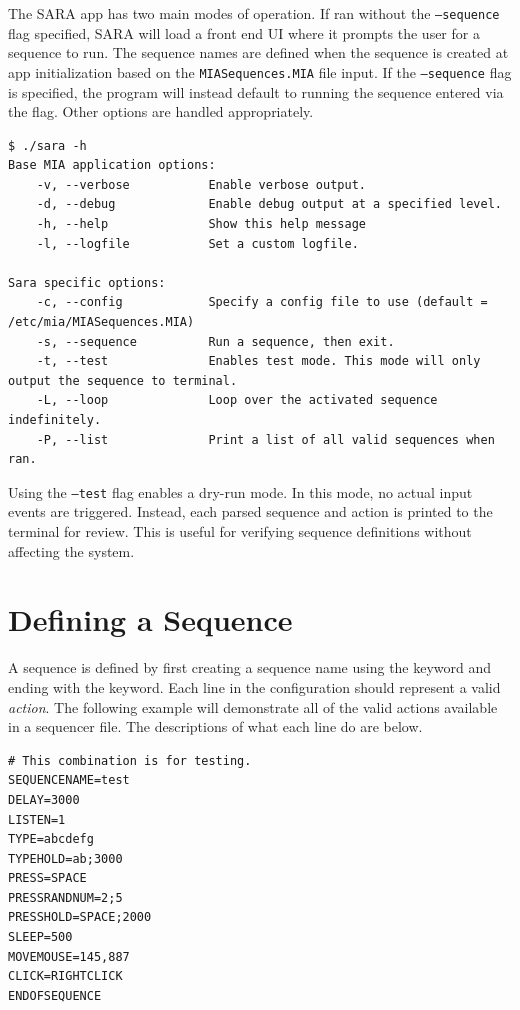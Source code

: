 The SARA app has two main modes of operation. If ran without the \texttt{--sequence} flag specified, SARA will load a front end UI where it prompts the user for a sequence to run. The sequence names are defined when the sequence is created at app initialization based on the \texttt{MIASequences.MIA} file input. If the \texttt{--sequence} flag is specified, the program will instead default to running the sequence entered via the flag. Other options are handled appropriately.

\begin{lstlisting}[style=terminalstyle]
$ ./sara -h
Base MIA application options:
	-v, --verbose           Enable verbose output.
	-d, --debug             Enable debug output at a specified level.
	-h, --help              Show this help message
	-l, --logfile           Set a custom logfile.

Sara specific options:
	-c, --config            Specify a config file to use (default = /etc/mia/MIASequences.MIA)
	-s, --sequence          Run a sequence, then exit.
	-t, --test              Enables test mode. This mode will only output the sequence to terminal.
	-L, --loop              Loop over the activated sequence indefinitely.
	-P, --list              Print a list of all valid sequences when ran.
\end{lstlisting}

Using the \texttt{--test} flag enables a dry-run mode. In this mode, no actual input events are triggered. Instead, each parsed sequence and action is printed to the terminal for review. This is useful for verifying sequence definitions without affecting the system.


\section{Defining a Sequence}

A sequence is defined by first creating a sequence name using the  keyword and ending with the  keyword. Each line in the configuration should represent a valid \textit{action}. The following example will demonstrate all of the valid actions available in a sequencer file. The descriptions of what each line do are below.

\begin{lstlisting}[style=pythonstyle]
# This combination is for testing.
SEQUENCENAME=test
DELAY=3000
LISTEN=1
TYPE=abcdefg
TYPEHOLD=ab;3000
PRESS=SPACE
PRESSRANDNUM=2;5
PRESSHOLD=SPACE;2000
SLEEP=500
MOVEMOUSE=145,887
CLICK=RIGHTCLICK
ENDOFSEQUENCE
\end{lstlisting}

